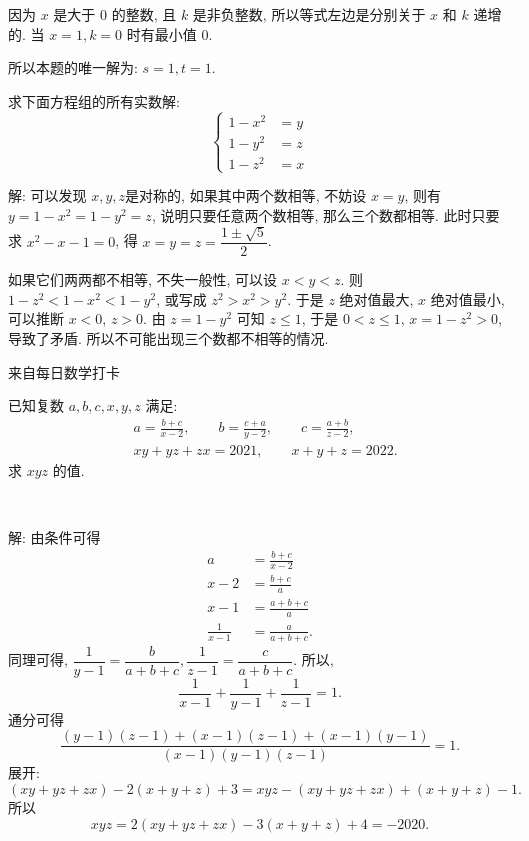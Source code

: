 因为 $ x $ 是大于 0 的整数, 且 $ k $ 是非负整数, 所以等式左边是分别关于 $ x $ 和 $ k $ 递增的. 当 $ x = 1, k = 0 $ 时有最小值 0.

所以本题的唯一解为: $ s = 1, t = 1 $.

\newpage


求下面方程组的所有实数解:
\[
\begin{cases}
1 - x^2 & = y \\
1 - y^2 & = z \\
1 - z^2 & = x 
\end{cases}
\]

解: 可以发现 $x,y,z $是对称的, 如果其中两个数相等, 不妨设 $ x=y $, 则有 $ y = 1 - x^2 = 1 - y^2 = z $, 说明只要任意两个数相等, 那么三个数都相等. 此时只要求 $ x^2 - x - 1 = 0 $, 得 $ x = y = z = \dfrac{1\pm \sqrt{5}}{2} $.

如果它们两两都不相等, 不失一般性, 可以设 $ x < y < z $. 则 $ 1-z^2 < 1-x^2 < 1-y^2 $, 或写成 $ z^2 > x^2 > y^2 $. 于是 $z$ 绝对值最大, $x$ 绝对值最小, 可以推断 $ x < 0 $, $ z > 0 $. 由 $ z = 1 - y^2 $ 可知 $ z \le 1 $, 于是 $ 0 < z \le 1 $, $ x = 1 - z^2 > 0 $, 导致了矛盾. 所以不可能出现三个数都不相等的情况.

\newpage
\noindent 来自每日数学打卡

已知复数 $a,b,c,x,y,z$ 满足:
\begin{align*}
& a = \frac{b+c}{x-2}, \qquad b = \frac{c+a}{y-2},\qquad c = \frac{a+b}{z-2},\\
& xy+yz+zx = 2021,\qquad x+y+z=2022.
\end{align*}
求 $xyz$ 的值.

~

解: 由条件可得
\begin{align*}
a &= \frac{b+c}{x-2}\\
x-2 &= \frac{b+c}{a}\\
x-1 &= \frac{a+b+c}{a}\\
\frac{1}{x-1} &= \frac{a}{a+b+c}.
\end{align*}
同理可得, $\dfrac{1}{y-1} = \dfrac{b}{a+b+c}, \dfrac{1}{z-1} = \dfrac{c}{a+b+c}$.
所以, 
\[\frac{1}{x-1} + \frac{1}{y-1}+\frac{1}{z-1} = 1.\]
通分可得
\[\frac{(y-1)(z-1)+(x-1)(z-1)+(x-1)(y-1)}{(x-1)(y-1)(z-1)} = 1.\]
展开:
\[ (xy + yz + zx) - 2(x+y+z) + 3 = xyz - (xy+yz+zx) + (x+y+z) - 1.\]
所以
\[xyz = 2(xy+yz+zx) - 3(x+y+z) + 4 = -2020.\]

